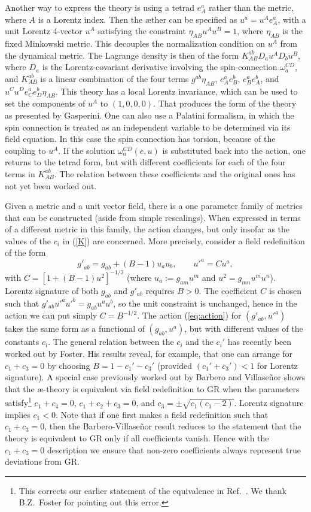 \documentclass[aps]{ws-procs9x6}
\def\beq{\begin{equation}}
\def\eeq{\end{equation}}
\begin{document}
Another way to express the theory is using a tetrad $e^a_A$ rather
than the metric, where $A$ is a Lorentz index. Then the {\ae}ther
can be specified as $u^a= u^A e^a_A$, with a unit Lorentz 4-vector
$u^A$ satisfying the constraint $\eta_{AB}u^A u^B=1$, where
$\eta_{AB}$ is the fixed Minkowski metric. This decouples the
normalization condition on $u^A$ from the dynamical metric. The
Lagrange density is then of the form $K^{ab}_{AB} D_a u^A D_b
u^B$, where $D_a$ is the Lorentz-covariant derivative involving
the spin-connection $\omega_a^{CD}$, and $K^{ab}_{AB}$ is a linear
combination of the four terms $g^{ab}\eta_{AB}$, $e^a_A e^b_B$,
$e^a_B e^b_A$, and $u^Cu^De^a_Ce^b_D\eta_{AB}$. This theory has a
local Lorentz invariance, which can be used to set the components
of $u^A$ to $(1,0,0,0)$. That produces the form of the theory as
presented by Gasperini.\cite{Gasperini} One can also use a
Palatini formalism, in which the spin connection is treated as an
independent variable to be determined via its field equation. In
this case the spin connection has torsion, because of the coupling
to $u^A$. If the solution $\omega_a^{CD}(e,u)$ is substituted back
into the action, one returns to the tetrad form, but with
different coefficients for each of the four terms in
$K^{ab}_{AB}$. The relation between these coefficients and the
original ones has not yet been worked out.


Given a metric and a unit vector field, there is a one parameter
family of metrics that can be constructed (aside from simple
rescalings). When expressed in terms of a different metric in this
family, the action changes, but only insofar as the values of the
$c_i$ in (\ref{K}) are concerned. More precisely, consider a field
redefinition of the form
%
\beq {g'}_{ab}={g}_{ab}+(B-1) u_au_b, \qquad
u'^a=Cu^a, \eeq
%
with $C = [1 + (B-1)u^2]^{-1/2}$ (where $u_a:=g_{am}u^m$ and
$u^2=g_{mn}u^m u^n$). Lorentz signature of both $g_{ab}$ and
$g'_{ab}$ requires $B>0$. The coefficient $C$ is chosen such that
$g'_{ab}u'^a u'^b = g_{ab}u^a u^b$, so the unit constraint is
unchanged, hence in the action we can put simply $C=B^{-1/2}$. The
action (\ref{eq:action}) for $(g'_{ab},u'^a)$ takes the same form
as a functional of $(g_{ab},u^a)$, but with different values of
the constants $c_i$.  The general relation between the $c_i$ and
the $c_i'$ has recently been worked out by Foster\cite{BZredef}.
His results reveal, for example, that one can arrange for
$c_1+c_3=0$ by choosing $B=1-c_1'-c_3'$ (provided $(c_1'+c_3')<1$
for Lorentz signature). A special case previously worked out by
Barbero and Villase\~{n}or\cite{Barbero} shows that the
{\ae}-theory is equivalent via field redefinition to GR when the
parameters satisfy\footnote{This corrects our earlier statement of
the equivalence in Ref.~. We thank B.Z.~Foster
for pointing out this error.} $c_1+c_4=0$, $c_1 +c_2+c_3=0$, and
$c_3=\pm\sqrt{c_1(c_1-2)}$. Lorentz signature implies $c_1<0$.
Note that if one first makes a field redefinition such that
$c_1+c_3=0$, then the Barbero-Villase\~{n}or result reduces to the
statement that the theory is equivalent to GR only if all
coefficients vanish.  Hence with the $c_1+c_3=0$ description we
ensure that non-zero coefficients always represent true deviations
from GR.
\end{document}
